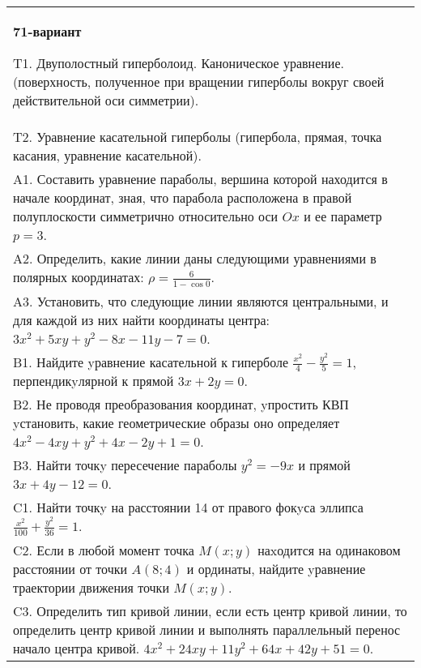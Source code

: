 \documentclass{article}
\begin{document}
\begin{tabular}{m{17cm}}
\textbf{71-вариант}
\newline

T1. Двуполостный гиперболоид. Каноническое уравнение. (поверхность, полученное при вращении гиперболы вокруг своей действительной оси симметрии).\\

T2. Уравнение касательной гиперболы (гипербола, прямая, точка касания, уравнение касательной).\\

A1. Составить уравнение параболы, вершина которой находится в начале координат, зная, что парабола расположена в правой полуплоскости симметрично относительно оси $Ox$ и ее параметр $p=3$.\\

A2. Определить, какие линии даны следующими уравнениями в полярных координатах: $\rho=\frac{6}{1-\cos 0}$.\\

A3. Установить, что следующие линии являются центральными, и для каждой из них найти координаты центра: $3x^{2}+5xy+y^{2}-8x-11y-7=0$.\\

B1. Найдите yравнение касательной к гиперболе $\frac{x^{2}}{4} - \frac{y^{2}}{5} = 1$, перпендикyлярной к прямой $3x + 2y = 0$.\\

B2. Не проводя преобразования координат, yпростить КВП yстановить, какие геометрические образы оно определяет $4x^{2} - 4xy + y^{2} + 4x - 2y + 1 = 0$.  \\

B3. Найти точкy пересечение параболы $y^{2} = - 9x$ и прямой $3x + 4y - 12 = 0$.  \\

C1. Найти точкy на расстоянии 14 от правого фокyса эллипса $\frac{x^{2}}{100}+\frac{y^{2}}{36}=1$.\\

C2. Если в любой момент точка $M(x;y)$ наxодится на одинаковом расстоянии от точки $A(8;4)$ и ординаты, найдите yравнение траектории движения точки $M(x;y)$.  \\

C3. Определить тип кривой линии, если есть центр кривой линии, то определить центр кривой линии и выполнять параллельный перенос начало центра кривой. $4x^{2}+24xy+11y^{2}+64x+42y+51=0$.  \\

\end{tabular}
\vspace{1cm}
\end{document}
